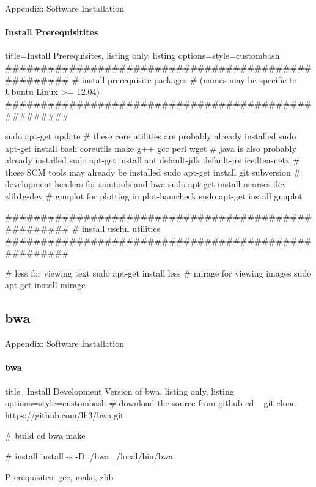 \documentclass{beamer}
\begin{document}
\begin{frame}[fragile]{Appendix: Software Installation}
\framesubtitle{Install Prerequisitites}
\begin{tcblisting}{title={Install Prerequisites}, listing only, listing options={style=custombash}}
####################################################
# install prerequisite packages 
# (names may be specific to Ubuntu Linux >= 12.04)
####################################################

sudo apt-get update
# these core utilities are probably already installed 
sudo apt-get install bash coreutils make g++ gcc perl wget
# java is also probably already installed
sudo apt-get install ant default-jdk default-jre icedtea-netx 
# these SCM tools may already be installed 
sudo apt-get install git subversion 
# development headers for samtools and bwa
sudo apt-get install ncurses-dev zlib1g-dev 
# gnuplot for plotting in plot-bamcheck
sudo apt-get install gnuplot 

####################################################
# install useful utilities 
####################################################

# less for viewing text
sudo apt-get install less 
# mirage for viewing images
sudo apt-get install mirage
\end{tcblisting}
\end{frame}


\subsection*{bwa}
\begin{frame}[fragile]{Appendix: Software Installation}
\framesubtitle{bwa}
\begin{tcblisting}{title={Install Development Version of bwa}, listing only, listing options={style=custombash}}
# download the source from github
cd ~
git clone https://github.com/lh3/bwa.git

# build 
cd bwa
make 

# install
install -s -D ./bwa ~/local/bin/bwa
\end{tcblisting}

Prerequisites: 
gcc,
make,
zlib 

\end{frame}
\end{document}
